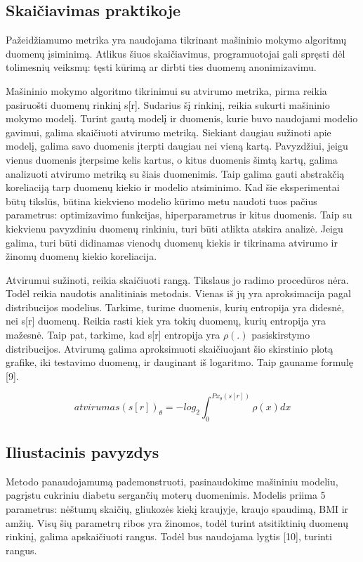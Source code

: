 \documentclass{VUMIFInfBakalaurinis}
\begin{document}
\subsection{Skaičiavimas praktikoje}
\par Pažeidžiamumo metrika  yra naudojama tikrinant mašininio mokymo algoritmų duomenų įsiminimą. Atlikus šiuos skaičiavimus, programuotojai gali spręsti dėl tolimesnių veiksmų: tęsti kūrimą ar dirbti ties duomenų anonimizavimu.
\par Mašininio mokymo algoritmo tikrinimui su atvirumo metrika, pirma reikia pasiruošti duomenų rinkinį s[r]. Sudarius šį rinkinį, reikia sukurti mašininio mokymo modelį. Turint gautą modelį ir duomenis, kurie buvo naudojami modelio gavimui, galima skaičiuoti atvirumo metriką. Siekiant daugiau sužinoti apie modelį, galima savo duomenis įterpti daugiau nei vieną kartą. Pavyzdžiui, jeigu vienus duomenis įterpsime kelis kartus, o kitus duomenis šimtą kartų, galima analizuoti atvirumo metriką su šiais duomenimis. Taip galima gauti abstrakčią koreliaciją tarp duomenų kiekio ir modelio atsiminimo. Kad šie eksperimentai būtų tikslūs, būtina kiekvieno modelio kūrimo metu naudoti tuos pačius parametrus: optimizavimo funkcijas, hiperparametrus ir kitus duomenis. Taip su kiekvienu pavyzdiniu duomenų rinkiniu, turi būti atlikta atskira analizė. Jeigu galima, turi būti didinamas vienodų duomenų kiekis ir tikrinama atvirumo ir žinomų duomenų kiekio koreliacija.
\par Atvirumui sužinoti, reikia skaičiuoti rangą. Tikslaus jo radimo procedūros nėra. Todėl reikia naudotis analitiniais metodais. Vienas iš jų yra aproksimacija pagal distribucijos modelius. Tarkime, turime duomenis, kurių entropija yra didesnė, nei s[r] duomenų. Reikia rasti kiek yra tokių duomenų, kurių entropija yra mažesnė. Taip pat, tarkime, kad s[r] entropija yra $\rho(.)$ pasiskirstymo distribucijos. Atvirumą galima aproksimuoti skaičiuojant šio skirstinio plotą grafike, iki testavimo duomenų, ir dauginant iš logaritmo.
Taip gauname formulę [9].

\begin{equation}
atvirumas(s[r])_{\theta} = -log_{2} \int_{0}^{Px_{\theta}(s[r])} \rho(x)dx
\end{equation}

\subsection{Iliustacinis pavyzdys}
\par Metodo panaudojamumą pademonstruoti, pasinaudokime mašininiu modeliu, pagrįstu cukriniu diabetu sergančių moterų duomenimis. Modelis priima 5 parametrus: nėštumų skaičių, gliukozės kiekį kraujyje, kraujo spaudimą, BMI ir amžių. Visų šių parametrų ribos yra žinomos, todėl turint atsitiktinių duomenų rinkinį, galima apskaičiuoti rangus. Todėl bus naudojama lygtis [10], turinti rangus.
\end{document}
